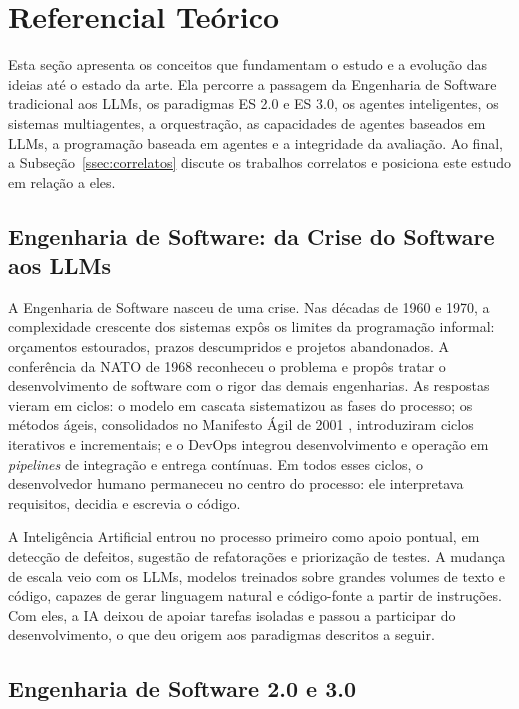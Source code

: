 \section{Referencial Teórico}
\label{referencial}

Esta seção apresenta os conceitos que fundamentam o estudo e a evolução das ideias até o estado da arte. Ela percorre a passagem da Engenharia de Software tradicional aos LLMs, os paradigmas ES 2.0 e ES 3.0, os agentes inteligentes, os sistemas multiagentes, a orquestração, as capacidades de agentes baseados em LLMs, a programação baseada em agentes e a integridade da avaliação. Ao final, a Subseção~\ref{ssec:correlatos} discute os trabalhos correlatos e posiciona este estudo em relação a eles.

\subsection{Engenharia de Software: da Crise do Software aos LLMs}
\label{ssec:origens}

A Engenharia de Software nasceu de uma crise. Nas décadas de 1960 e 1970, a complexidade crescente dos sistemas expôs os limites da programação informal: orçamentos estourados, prazos descumpridos e projetos abandonados. A conferência da NATO de 1968 \citep{Naur1969NATO} reconheceu o problema e propôs tratar o desenvolvimento de software com o rigor das demais engenharias. As respostas vieram em ciclos: o modelo em cascata sistematizou as fases do processo; os métodos ágeis, consolidados no Manifesto Ágil de 2001 \citep{Beck2001AgileManifesto}, introduziram ciclos iterativos e incrementais; e o DevOps integrou desenvolvimento e operação em \textit{pipelines} de integração e entrega contínuas. Em todos esses ciclos, o desenvolvedor humano permaneceu no centro do processo: ele interpretava requisitos, decidia e escrevia o código.

A Inteligência Artificial entrou no processo primeiro como apoio pontual, em detecção de defeitos, sugestão de refatorações e priorização de testes. A mudança de escala veio com os LLMs, modelos treinados sobre grandes volumes de texto e código, capazes de gerar linguagem natural e código-fonte a partir de instruções. Com eles, a IA deixou de apoiar tarefas isoladas e passou a participar do desenvolvimento, o que deu origem aos paradigmas descritos a seguir.

\subsection{Engenharia de Software 2.0 e 3.0}
\label{ssec:es2es3}

